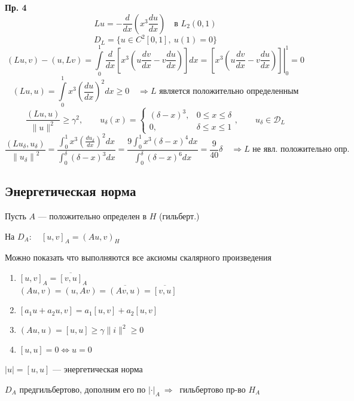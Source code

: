 \documentclass[12pt, a4paper]{article}
\begin{document}
\textbf{Пр. 4}
\[ Lu = - \frac{d }{ d x } \left(x^3 \frac{du}{dx}\right) \quad \text{в } L_2 (0,1) \]
\[ D_L = \{u \in C^2[0,1], \ u(1) = 0 \} \]
\[(Lu, v) - (u, Lv) = \int\limits_{0}^{1} \frac{d}{dx} \left[ x^3 \left(u \frac{dv }{dx } - v \frac{du }{dx } \right)  \right] dx = \left. \left[ x^3 \left(u \frac{dv }{dx } - v \frac{du }{dx } \right) \right] \right|_0^1 = 0\]
\[ (Lu, u) = \int\limits_{0}^{1} x^3 {\left(\frac{du }{dx }\right)}^2 dx \geq 0 \quad \Rightarrow L \text{ является положительно определенным} \]
\[ \frac{(Lu, u)}{\|u\|^2} \geq \gamma^2, \qquad u_\delta (x) = \begin{cases}
	(\delta - x)^3, & 0 \leq x \leq \delta \\
	0, & \delta \leq x \leq 1
\end{cases}, \qquad u_\delta \in \mathcal{D}_L  \]
\[ \frac{(Lu_\delta , u_\delta)}{{\|u_\delta\|}^2}  = \frac{\int_{0}^{1} x^3 {(\frac{du_\delta}{dx})}^2 dx}{\int_{0}^{\delta} {(\delta -x)}^3 dx} = \frac{9 \int_{0}^{1} x^3 {(\delta -x)}^4 dx}{\int_{0}^{\delta} {(\delta -x)}^6 dx} = \frac{9}{40} \delta \quad \Rightarrow L \text{ не явл. положительно опр.} \]

\newpage

\subsection{Энергетическая норма}

Пусть $A$ --- положительно определен в $H$ (гильберт.)

На $D_A: \quad {[u, v]}_A = {(A u, v)}_H$
 
Можно показать что выполняются все аксиомы скалярного произведения

\begin{enumerate}
	\item $ {[u, v]}_A = \overline{[v, u]}_A $ \\
		  $ (Au, v) = (u, Av) = \overline{(Av, u)} = \overline{[v, u]} $
	\item $ [a_1 u + a_2 u, v] = a_1[u, v] + a_2[u, v]$
	\item $ (Au, u) = [u, u] \geq \gamma \|i\|^2 \geq 0 $
	\item $ [u, u] = 0 \Leftrightarrow u = 0 $
\end{enumerate}

$ |u| = [u, u] $ --- энергетическая норма

$ D_A $ предгильбертово, дополним его по $ {|\boldsymbol{\cdot}|}_A \ \Rightarrow \ $ гильбертово пр-во $ H_A $ 
\end{document}
